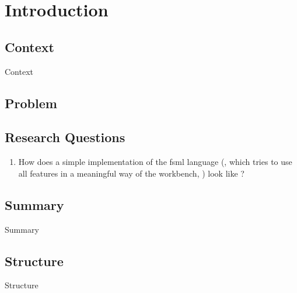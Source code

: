 \chapter{Introduction}



\section{Context}

Context

\newpage

\section{Problem}

\newpage

\section{Research Questions}

\begin{enumerate}
  \item How does a simple implementation of the fsml language (, which tries to
   use all features in a meaningful way of the workbench, ) look like ?
\end{enumerate}

\newpage

\section{Summary}

Summary

\newpage

\section{Structure}

Structure